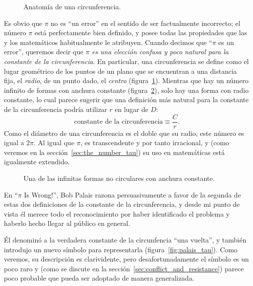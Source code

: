 \begin{figure}
\caption{Anatomía de una circunferencia.\label{fig:circle}}
\end{figure}

Es obvio que $\pi$ no es ``un error'' en el sentido de ser factualmente incorrecto; el número $\pi$ está perfectamente bien definido, y posee todas las propiedades que las y los matemáticos habitualmente le atribuyen. Cuando decimos que ``$\pi$ es un error'', queremos decir que \emph{$\pi$ es una elección confusa y poco natural para la constante de la circunferencia}. En particular, una circunferencia se define como el lugar geométrico de los puntos de un plano que se encuentran a una distancia fija, el \emph{radio}, de un punto dado, el \emph{centro} (figura~\ref{fig:circle}). Mientras que hay un número infinito de formas con anchura constante (figura~\ref{fig:constant_width}), solo hay una forma con radio constante, lo cual parece sugerir que una definición más natural para la constante de la circunferencia podría utilizar $r$ en lugar de $D$:
\begin{equation}
\label{eq:circle_constant}
\mbox{constante de la circunferencia} \equiv \frac{C}{r}.
\end{equation}
Como el diámetro de una circunferencia es el doble que su radio, este número es igual a $2\pi$. Al igual que $\pi$, es transcendente y por tanto irracional, y (como veremos en la sección~\ref{sec:the_number_tau}) su uso en matemáticas está igualmente extendido.

\begin{figure}
\caption{Una de las infinitas formas no circulares con anchura constante.\label{fig:constant_width}}
\end{figure}

En ``$\pi$ Is Wrong!'', Bob Palais razona persuasivamente a favor de la segunda de estas dos definiciones de la constante de la circunferencia, y desde mi punto de vista él merece
todo el reconocimiento por haber identificado el problema y haberlo hecho llegar al público en general.

Él denominó a la verdadera constante de la circunfencia ``una vuelta'', y también introdujo un nuevo símbolo para representarla (figura~\ref{fig:palais_tau}). Como veremos, su descripción es clarividente, pero desafortunadamente el símbolo es un poco raro y (como se discute en la sección~\ref{sec:conflict_and_resistance}) parece poco probable que pueda ser adoptado de manera generalizada.

